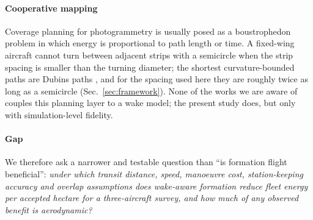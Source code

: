 \paragraph{Cooperative mapping} Coverage planning for photogrammetry is usually posed as a boustrophedon problem in which energy is proportional to path length or time. A fixed-wing aircraft cannot turn between adjacent strips with a semicircle when the strip spacing is smaller than the turning diameter; the shortest curvature-bounded paths are Dubins paths \cite{dubins1957}, and for the spacing used here they are roughly twice as long as a semicircle (Sec.~\ref{sec:framework}). None of the works we are aware of couples this planning layer to a wake model; the present study does, but only with simulation-level fidelity.

\paragraph{Gap} We therefore ask a narrower and testable question than ``is formation flight beneficial'': \emph{under which transit distance, speed, manoeuvre cost, station-keeping accuracy and overlap assumptions does wake-aware formation reduce fleet energy per accepted hectare for a three-aircraft survey, and how much of any observed benefit is aerodynamic?}

